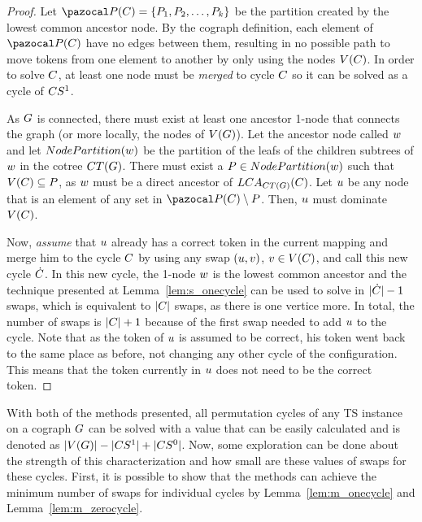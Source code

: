 \documentclass[msc]{ppgccufmg}    %
\begin{document}
\begin{proof}
Let $\partitionFunc{\cycle} = \createSet{\partitionElem_{1}, \partitionElem_{2}, 
\ldots, \partitionElem_{k}}$ be the partition created by the lowest common
ancestor node.
By the cograph definition, each element of $\partitionFunc{\cycle}$ have no
edges between them, resulting in no possible path to move tokens from one 
element to another by only using the nodes $V(C)$.
In order to solve $C$, at least one node must be \textit{merged} to cycle 
$C$ so it can be solved as a cycle of $CS^{1}$.

As $G$ is connected, there must exist at least one ancestor 1-node that 
connects the graph (or more locally, the nodes of $V(G)$).
Let the ancestor node called $w$ and let
$NodePartition(w)$ be the partition of the leafs of the children 
subtrees of $w$ in the cotree $CT(G)$.
There must exist a $P \in NodePartition(w)$ such that 
$V(C) \subseteq P$, as $w$ must be 
a direct ancestor of $LCA_{CT(G)}(C)$.
Let $u$ be any node that is an element of any set in $\partitionFunc{\cycle} 
\setminus \partitionElem$.
Then, $u$ must dominate $V(C)$.

Now, \textit{assume} that $u$ already has a correct token in the current 
mapping and merge him to the cycle $C$ by using any swap $(u,
v)$, $v \in V(C)$, and call this new cycle $\dot{C}$.
In this new cycle, the 1-node $w$ is the lowest common ancestor and the
technique presented at Lemma~\ref{lem:s_onecycle} can be used to solve in 
$|\dot{C}| - 1$ swaps, which is equivalent to $|C|$
swaps, as there is one vertice more. 
In total, the number of swaps is $|C| + 1$ because of the first swap 
needed to add $u$ to the cycle.
Note that as the token of $u$ is assumed to be correct, his token went
back to the same place as before, not changing any other cycle of the
configuration.
This means that the token currently in $u$ does not need to be the correct
token.
\end{proof}

With both of the methods presented, all permutation cycles of any TS instance
on a cograph $G$ can be solved with a value that can be easily calculated 
and is denoted as $|V(G)| - |CS^{1}| + 
|CS^{0}|$.
Now, some exploration can be done about the strength of this characterization
and how small are these values of swaps for these cycles.
First, it is possible to show that the methods can achieve the minimum
number of swaps for individual cycles by Lemma~\ref{lem:m_onecycle} and
Lemma~\ref{lem:m_zerocycle}.
\end{document}
